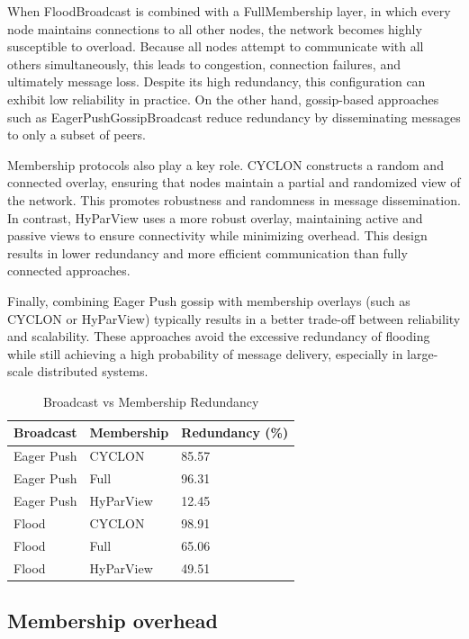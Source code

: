 \documentclass[sigconf,a4paper]{acmart}
\begin{document}
When FloodBroadcast is combined with a FullMembership layer, in which every node maintains 
connections to all other nodes, the network becomes highly susceptible to overload. Because 
all nodes attempt to communicate with all others simultaneously, this leads to congestion, 
connection failures, and ultimately message loss. Despite its high redundancy, this 
configuration can exhibit low reliability in practice. On the other hand, gossip-based 
approaches such as EagerPushGossipBroadcast reduce redundancy by disseminating messages 
to only a subset of peers.

Membership protocols also play a key role. CYCLON constructs a random and connected overlay, 
ensuring that nodes maintain a partial and randomized view of the network. This promotes 
robustness and randomness in message dissemination. In contrast, HyParView uses a more robust 
overlay, maintaining active and passive views to ensure connectivity while minimizing overhead. 
This design results in lower redundancy and more efficient communication than fully connected 
approaches.

Finally, combining Eager Push gossip with membership overlays (such as CYCLON or HyParView) 
typically results in a better trade-off between reliability and scalability. These approaches 
avoid the excessive redundancy of flooding while still achieving a high probability of message 
delivery, especially in large-scale distributed systems.

\begin{table}[h]
\centering
\begin{tabular}{lll}
\hline
\textbf{Broadcast} & \textbf{Membership} & \textbf{Redundancy (\%)} \\
\hline
Eager Push & CYCLON & 85.57 \\ Eager Push & Full & 96.31 \\ Eager Push & HyParView & 12.45 \\ Flood & CYCLON & 98.91 \\ Flood & Full & 65.06 \\ Flood & HyParView & 49.51 \\
\hline
\end{tabular}
\caption{Broadcast vs Membership Redundancy}
\label{tab:broadcast_membership}
\end{table}

\subsection{Membership overhead}
\end{document}
